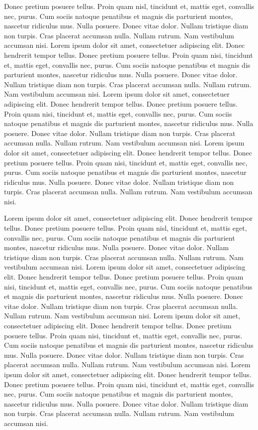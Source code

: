 \documentclass[12pt]{report}
\begin{document}
Donec pretium posuere tellus. Proin quam nisl, tincidunt et, mattis
eget, convallis nec, purus. Cum sociis natoque penatibus et magnis dis
parturient montes, nascetur ridiculus mus. Nulla posuere. Donec vitae
dolor. Nullam tristique diam non turpis. Cras placerat accumsan
nulla. Nullam rutrum. Nam vestibulum accumsan nisi.  Lorem ipsum dolor
sit amet, consectetuer adipiscing elit. Donec hendrerit tempor
tellus. Donec pretium posuere tellus. Proin quam nisi, tincidunt et,
mattis eget, convallis nec, purus. Cum sociis natoque penatibus et
magnis dis parturient montes, nascetur ridiculus mus. Nulla
posuere. Donec vitae dolor. Nullam tristique diam non turpis. Cras
placerat accumsan nulla. Nullam rutrum. Nam vestibulum accumsan nisi.
Lorem ipsum dolor sit amet, consectetuer adipiscing elit. Donec
hendrerit tempor tellus. Donec pretium posuere tellus. Proin quam
nisi, tincidunt et, mattis eget, convallis nec, purus. Cum sociis
natoque penatibus et magnis dis parturient montes, nascetur ridiculus
mus. Nulla posuere. Donec vitae dolor. Nullam tristique diam non
turpis. Cras placerat accumsan nulla. Nullam rutrum. Nam vestibulum
accumsan nisi.  Lorem ipsum dolor sit amet, consectetuer adipiscing
elit. Donec hendrerit tempor tellus. Donec pretium posuere
tellus. Proin quam nisi, tincidunt et, mattis eget, convallis nec,
purus. Cum sociis natoque penatibus et magnis dis parturient montes,
nascetur ridiculus mus. Nulla posuere. Donec vitae dolor. Nullam
tristique diam non turpis. Cras placerat accumsan nulla. Nullam
rutrum. Nam vestibulum accumsan nisi.

Lorem ipsum dolor sit amet, consectetuer adipiscing elit. Donec
hendrerit tempor tellus. Donec pretium posuere tellus. Proin quam
nisl, tincidunt et, mattis eget, convallis nec, purus. Cum sociis
natoque penatibus et magnis dis parturient montes, nascetur ridiculus
mus. Nulla posuere. Donec vitae dolor. Nullam tristique diam non
turpis. Cras placerat accumsan nulla. Nullam rutrum. Nam vestibulum
accumsan nisi.  Lorem ipsum dolor sit amet, consectetuer adipiscing
elit. Donec hendrerit tempor tellus. Donec pretium posuere
tellus. Proin quam nisi, tincidunt et, mattis eget, convallis nec,
purus. Cum sociis natoque penatibus et magnis dis parturient montes,
nascetur ridiculus mus. Nulla posuere. Donec vitae dolor. Nullam
tristique diam non turpis. Cras placerat accumsan nulla. Nullam
rutrum. Nam vestibulum accumsan nisi.  Lorem ipsum dolor sit amet,
consectetuer adipiscing elit. Donec hendrerit tempor tellus. Donec
pretium posuere tellus. Proin quam nisi, tincidunt et, mattis eget,
convallis nec, purus. Cum sociis natoque penatibus et magnis dis
parturient montes, nascetur ridiculus mus. Nulla posuere. Donec vitae
dolor. Nullam tristique diam non turpis. Cras placerat accumsan
nulla. Nullam rutrum. Nam vestibulum accumsan nisi.  Lorem ipsum dolor
sit amet, consectetuer adipiscing elit. Donec hendrerit tempor
tellus. Donec pretium posuere tellus. Proin quam nisi, tincidunt et,
mattis eget, convallis nec, purus. Cum sociis natoque penatibus et
magnis dis parturient montes, nascetur ridiculus mus. Nulla
posuere. Donec vitae dolor. Nullam tristique diam non turpis. Cras
placerat accumsan nulla. Nullam rutrum. Nam vestibulum accumsan nisi.
\end{document}
